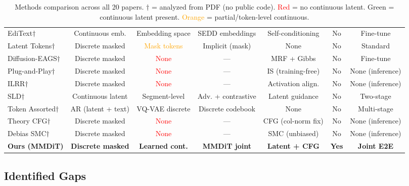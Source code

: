 \documentclass{article}
\begin{document}
\begin{table}[h]
\begin{adjustbox}{max width=\textwidth}
\begin{tabular}{@{}lcccccc@{}}
EdiText$\dagger$ & Continuous emb. & Embedding space & SEDD embeddings & Self-conditioning & No & Fine-tune \\
Latent Tokens$\dagger$ & Discrete masked & \textcolor{orange}{Mask tokens} & Implicit (mask) & None & No & Standard \\
Diffusion-EAGS$\dagger$ & Discrete masked & \textcolor{red}{None} & --- & MRF + Gibbs & No & Fine-tune \\
Plug-and-Play$\dagger$ & Discrete masked & \textcolor{red}{None} & --- & IS (training-free) & No & None (inference) \\
ILRR$\dagger$ & Discrete masked & \textcolor{red}{None} & --- & Activation align. & No & None (inference) \\
SLD$\dagger$ & Continuous latent & \textcolor{green!60!black}{Segment-level} & Adv. + contrastive & Latent guidance & No & Two-stage \\
Token Assorted$\dagger$ & AR (latent + text) & \textcolor{green!60!black}{VQ-VAE discrete} & Discrete codebook & None & No & Multi-stage \\
Theory CFG$\dagger$ & Discrete masked & \textcolor{red}{None} & --- & CFG (col-norm fix) & No & None (inference) \\
Debias SMC$\dagger$ & Discrete masked & \textcolor{red}{None} & --- & SMC (unbiased) & No & None (inference) \\
\midrule
\textbf{Ours (MMDiT)} & \textbf{Discrete masked} & \textbf{\textcolor{green!60!black}{Learned cont.}} & \textbf{MMDiT joint} & \textbf{Latent + CFG} & \textbf{\textcolor{green!60!black}{Yes}} & \textbf{Joint E2E} \\
\bottomrule
\end{tabular}
\end{adjustbox}
\caption{Methods comparison across all 20 papers. $\dagger$ = analyzed from PDF (no public code). \textcolor{red}{Red} = no continuous latent. \textcolor{green!60!black}{Green} = continuous latent present. \textcolor{orange}{Orange} = partial/token-level continuous.}
\end{table}

\subsection{Identified Gaps}
\end{document}
